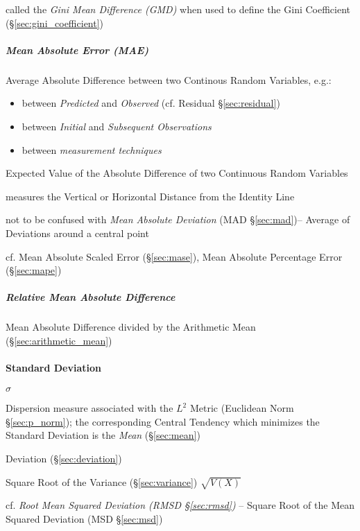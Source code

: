 called the \emph{Gini Mean Difference (GMD)} when used to define the Gini
Coefficient (\S\ref{sec:gini_coefficient})



\subparagraph{Mean Absolute Error (MAE)}\label{sec:mae}\hfill

Average Absolute Difference between two Continous Random Variables, e.g.:
\begin{itemize}
  \item between \emph{Predicted} and \emph{Observed} (cf. Residual
    \S\ref{sec:residual})
  \item between \emph{Initial} and \emph{Subsequent Observations}
  \item between \emph{measurement techniques}
\end{itemize}

Expected Value of the Absolute Difference of two Continuous Random Variables

measures the Vertical or Horizontal Distance from the Identity Line

\fist not to be confused with \emph{Mean Absolute Deviation} (MAD
\S\ref{sec:mad})-- Average of Deviations around a central point

cf. Mean Absolute Scaled Error (\S\ref{sec:mase}), Mean Absolute Percentage
Error (\S\ref{sec:mape})



\subparagraph{Relative Mean Absolute Difference}
\label{sec:relative_mean_absolute_difference}\hfill

Mean Absolute Difference divided by the Arithmetic Mean
(\S\ref{sec:arithmetic_mean})



\paragraph{Standard Deviation}\label{sec:standard_deviation}\hfill

$\sigma$

Dispersion measure associated with the $L^2$ Metric (Euclidean Norm
\S\ref{sec:p_norm}); the corresponding Central Tendency which minimizes the
Standard Deviation is the \emph{Mean} (\S\ref{sec:mean})

Deviation (\S\ref{sec:deviation})

Square Root of the Variance (\S\ref{sec:variance}) $\sqrt{V(X)}$

cf. \emph{Root Mean Squared Deviation (RMSD \S\ref{sec:rmsd})} -- Square Root of
the Mean Squared Deviation (MSD \S\ref{sec:msd})

